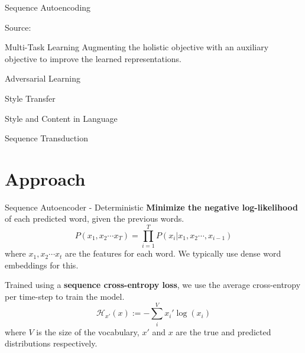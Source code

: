 \documentclass[aspectratio=169]{beamer}
\newcommand{\imgsrc}[1]{\tiny{Source: #1}}
\begin{document}
\begin{frame}{Sequence Autoencoding}
	\centering
	

	\imgsrc{\cite{srivastava2016unsupervised}}
\end{frame}

\begin{frame}{Multi-Task Learning}
	Augmenting the holistic objective with an auxiliary objective to improve the learned representations.
\end{frame}

\begin{frame}{Adversarial Learning}

\end{frame}

\begin{frame}{Style Transfer}
\end{frame}

\begin{frame}{Style and Content in Language}
\end{frame}

\begin{frame}{Sequence Transduction}
\end{frame}

% 

\section{Approach}

\begin{frame}{Sequence Autoencoder - Deterministic}
	\textbf{Minimize the negative log-likelihood} of each predicted word, given the previous words.
	\begin{equation}
		P(x_1, x_2 \cdots x_T) = \prod_{i=1}^T P(x_i | x_1, x_2 \cdots, x_{i-1})
	\end{equation}
	where $x_1, x_2 \cdots x_t$ are the features for each word. We typically use dense word embeddings \citep{mikolov2013distributed,pennington2014glove} for this.

	Trained using a \textbf{sequence cross-entropy loss}, we use the average cross-entropy per time-step to train the model.
	\begin{equation}
		\mathcal{H}_{x'} (x) := - \sum_{i}^V x_{i}' \log (x_i)
	\end{equation}
	where $V$ is the size of the vocabulary, $x'$ and $x$ are the true and predicted distributions respectively.
\end{frame}
\end{document}
